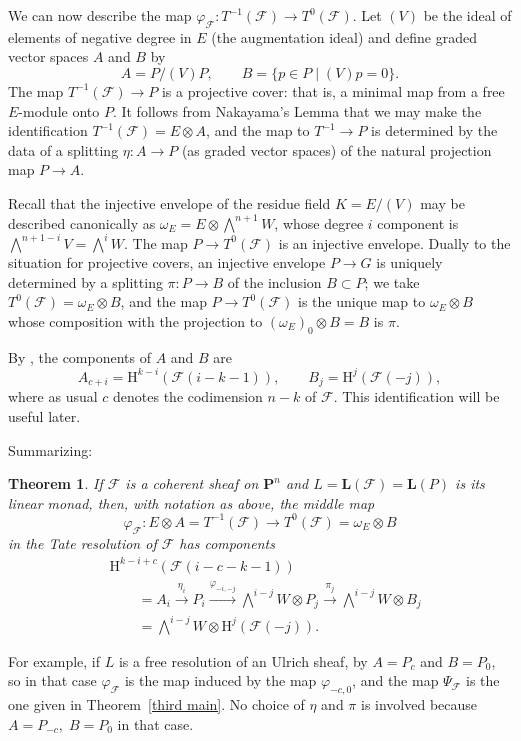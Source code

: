 \documentclass{jams-l}
\newtheorem{theorem}{Theorem}[section]
\theoremstyle{definition}
\theoremstyle{remark}
\newcommand{\F}{{\mathcal F}}
\newcommand{\Hrm}{{\mathrm H}}
\newcommand{\LL}{{\mathbf L}}
\newcommand{\PP}{{\mathbf P}}
\newcommand{\rTo}{\xrightarrow}
\begin{document}
We can now describe the map $\varphi_\F: T^{-1}(\F)\to T^0(\F)$.
Let $(V)$ be the ideal of elements of negative
degree in $E$ (the augmentation ideal) and define graded
vector spaces $A$ and $B$ by
\[
A=P/(V) P,\qquad B=\{p\in P\mid (V) p = 0\}. 
\]
The map $T^{-1}(\F)\to P$ is a
projective cover: that is, a minimal map from a free $E$-module 
onto $P$. It follows from Nakayama's Lemma that 
we may make the identification $T^{-1}(\F)= E\otimes A$,
and the map to $T^{-1}\to P$ is determined by the data of a 
splitting $\eta: A\to P$ (as 
graded vector spaces) of the natural projection map $P\to A$.

Recall that the injective envelope of the residue field $K=E/(V)$
may be described canonically as $\omega_E = E\otimes \bigwedge^{n+1}W$,
whose degree $i$ component is $\bigwedge^{n+1-i}V = \bigwedge^iW$.
The map $P\to T^0(\F)$ is an injective envelope.
Dually to the situation for projective covers,
an injective envelope $P\to G$ is uniquely determined
by a splitting $\pi: P\to B$ of the inclusion $B\subset P$;
we take $T^0(\F)= \omega_E\otimes B$, and the map $P\to T^0(\F)$
is the unique map to $\omega_E\otimes B$ whose composition
with the projection to $(\omega_E)_0\otimes B = B$ is $\pi$.

By \cite[Theorem 4.1]{Eisenbudetal.2001}, the components of $A$ and $B$ are
\[
A_{c+i}=\Hrm^{k-i}(\F(i-k-1)),\qquad
B_j=\Hrm^j(\F(-j)),
\]
where as usual $c$ denotes the codimension $n-k$ of $\F$. 
This identification will be useful later.
\pagebreak

Summarizing:

\begin{theorem}\label{formula for varphi} 
If $\F$ is a coherent sheaf on $\PP^n$
and $L=\LL(\F) =\LL(P)$ is its linear monad, then, with notation
as above, the middle map 
\[
\varphi_\F:E\otimes A= T^{-1}(\F)\to T^0(\F)=\omega_E\otimes B
\]
in the Tate resolution of $\F$ has components
\begin{align*}
&\Hrm^{k-i+c}(\F(i-c-k-1))\\ 
&\qquad =A_i\rTo{\eta_i} P_i 
\rTo{\varphi_{-i,-j}} 
\bigwedge^{i-j}W\otimes P_j
\rTo{\pi_j} \bigwedge^{i-j}W\otimes B_j\\
&\qquad =\bigwedge^{i-j}W\otimes \Hrm^j(\F(-j)).
\end{align*}
\end{theorem}

For example, if $L$ is a free resolution of
an Ulrich sheaf, by 
\cite[Proposition 8.7]{Eisenbudetal.2001}
$A=P_c$ and $B=P_0$, so in that case
$\varphi_\F$ is the map induced by the map $\varphi_{-c,0}$, 
and the map $\Psi_\F$
is the one given in Theorem~\ref{third main}.
No choice of $\eta$ and $\pi$ is involved because 
$A= P_{-c},\; B=P_0$ in that case.
\end{document}
